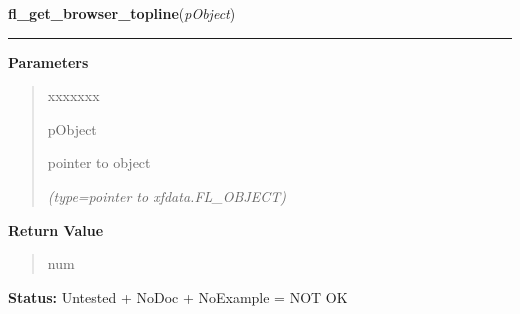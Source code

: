 \hspace{.8\funcindent}\begin{boxedminipage}{\funcwidth}

    \raggedright \textbf{fl\_get\_browser\_topline}(\textit{pObject})

    \vspace{-1.5ex}

    \rule{\textwidth}{0.5\fboxrule}
\setlength{\parskip}{2ex}
\setlength{\parskip}{1ex}
      \textbf{Parameters}
      \vspace{-1ex}

      \begin{quote}
        \begin{Ventry}{xxxxxxx}

          \item[pObject]

          pointer to object

            {\it (type=pointer to xfdata.FL\_OBJECT)}

        \end{Ventry}

      \end{quote}

      \textbf{Return Value}
    \vspace{-1ex}

      \begin{quote}
      num

      \end{quote}

\textbf{Status:} Untested + NoDoc + NoExample = NOT OK



    \end{boxedminipage}

    \label{xformslib:library:fl_get_browser}

    \vspace{0.5ex}

